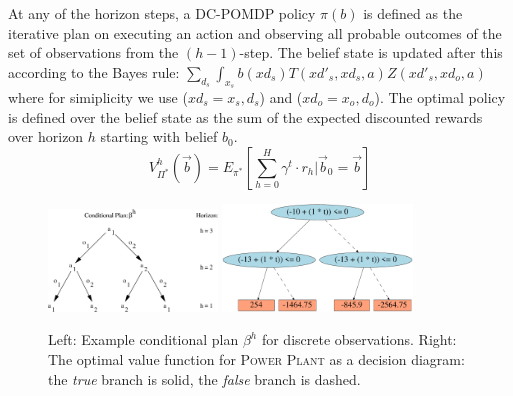 \documentclass{article} %
\begin{document}
 At any of the horizon steps, a DC-POMDP policy $\pi(b)$ is defined as the iterative plan on executing an action and observing all probable outcomes of the set of observations from the $(h-1)$-step. The belief state is updated after this according to the Bayes rule: $\sum_{d_s}\int_{x_s} b(xd_s)T(xd'_s,xd_s,a)Z(xd'_s,xd_o,a)$  where for simiplicity we use ($xd_s = x_s,d_s$) and ($xd_o=x_o,d_o$).
The optimal policy is defined over the belief state as the sum of the expected discounted rewards over horizon $h$ starting with belief $b_0$.
\begin{equation}
V^h_{\Pi^*}(\vec{b}) = E_{\pi^*} \left[ \sum_{h=0}^{H} \gamma^t \cdot r_h \Big| \vec{b}_0 = \vec{b} \right]\nonumber
\end{equation}
\begin{figure}[t!]
\begin{center}
\includegraphics[width=0.4\textwidth]{pics/cond_plan2.pdf}
\includegraphics[width=0.45\textwidth]{pics/b1-4.pdf}
\end{center}
\vspace{-2mm}
\caption{\footnotesize Left: Example conditional plan $\beta^h$ for discrete observations. Right: The optimal value function for \textsc{Power Plant}
as a decision diagram: 
the \emph{true} branch is solid, the \emph{false}
branch is dashed.}
\label{fig:cond_plan}
\vspace{-1mm}
\end{figure}
\end{document}
